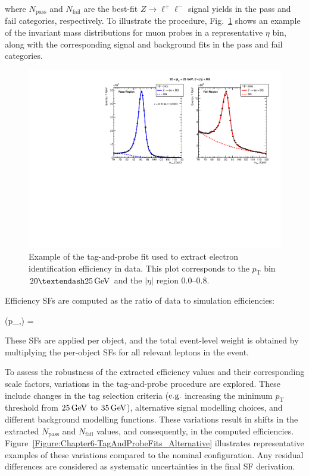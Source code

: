 where $N_{\text{pass}}$ and $N_{\text{fail}}$ are the best-fit $Z \rightarrow \ell^+\ell^-$ signal yields in the pass and fail categories, respectively. To illustrate the procedure, Fig.~\ref{Figure:Chapter6-TagAndProbeFits_Nominal} shows an example of the invariant mass distributions for muon probes in a representative $\eta$ bin, along with the corresponding signal and background fits in the pass and fail categories. 

\begin{figure}[h]
\centering
\includegraphics[width=\textwidth]{Figures/Chapter6/data_id_pt_20_to_25_eta_0.0_to_0.8_tpzee_nominal.pdf}
\caption{Example of the tag-and-probe fit used to extract electron identification efficiency in data. This plot corresponds to the $p_{\mathrm{T}}$ bin $20–25\GeV$ and the $|\eta|$ region 0.0–0.8.}
\label{Figure:Chapter6-TagAndProbeFits_Nominal}
\end{figure}

Efficiency \acp{SF} are computed as the ratio of data to simulation efficiencies:

\begin{equation_pad}
    (p_,\eta) = 
\end{equation_pad}

These SFs are applied per object, and the total event-level weight is obtained by multiplying the per-object SFs for all relevant leptons in the event.

To assess the robustness of the extracted efficiency values and their corresponding scale factors, variations in the tag-and-probe procedure are explored. These include changes in the tag selection criteria ($\mbox{e.g.}$ increasing the minimum $p_{\text{T}}$ threshold from $25\,\text{Ge\hspace{-.08em}V}$ to $35\,\text{Ge\hspace{-.08em}V}$), alternative signal modelling choices, and different background modelling functions. These variations result in shifts in the extracted $N_{\text{pass}}$ and $N_{\text{fail}}$ values, and consequently, in the computed efficiencies. Figure~\ref{Figure:Chapter6-TagAndProbeFits_Alternative} illustrates representative examples of these variations compared to the nominal configuration. Any residual differences are considered as systematic uncertainties in the final SF derivation.

